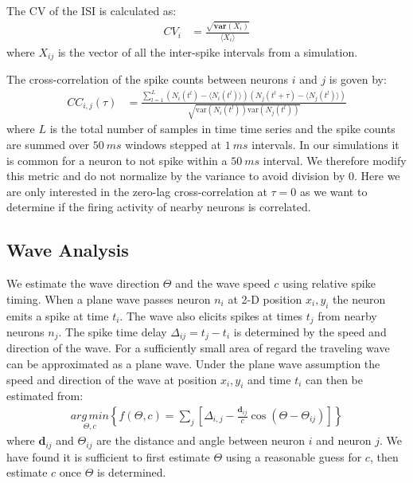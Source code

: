 \documentclass[12pt]{article}
\begin{document}
The CV of the ISI is calculated as:
\begin{align}\label{eq:cv}
 CV_{i} &= \frac{\sqrt{\textbf{var}(X_{i})}}{\langle X_{i} \rangle}
\end{align}
where $X_{ij}$ is the vector of all the inter-spike intervals from a simulation.

The cross-correlation of the spike counts between neurons $i$ and $j$ is goven by:
\begin{align}\label{eq:cross_correlation}
 CC_{i,j}(\tau) &= \frac{ \sum_{l=1}^L (N_i(t^l)-\langle N_i(t^l) \rangle) (N_j(t^l+\tau)-\langle N_j(t^l) \rangle) } { \sqrt{\text{var}(N_i(t^l))\text{var}(N_j(t^l))}  }
\end{align}
where $L$ is the total number of samples in time time series and the spike counts are summed over $50~ms$ windows stepped at $1~ms$ intervals.
In our simulations it is common for a neuron to not spike within a $50~ms$ interval.
We therefore modify this metric and do not normalize by the variance to avoid division by $0$.
Here we are only interested in the zero-lag cross-correlation at $\tau=0$ as we want to determine if the firing activity of nearby neurons is correlated.

\subsection{Wave Analysis}
We estimate the wave direction $\Theta$ and the wave speed $c$ using relative spike timing.
When a plane wave passes neuron $n_i$ at 2-D position $x_i,y_i$ the neuron emits a spike at time $t_i$.
The wave also elicits spikes at times $t_j$ from nearby neurons $n_j$.
The spike time delay $\Delta_{ij}=t_j-t_i$ is determined by the speed and direction of the wave.
For a sufficiently small area of regard the traveling wave can be approximated as a plane wave.
Under the plane wave assumption the speed and direction of the wave at position $x_i,y_i$ and time $t_i$ can then be estimated from:
\begin{align}\label{eq:wave_estimate}
\underset{\Theta,c}{arg\,min}\left\{f(\Theta,c) = \sum_j \left[ \Delta_{i,j}-\frac{\mathbf{d}_{ij}}{c}\cos(\Theta-\Theta_{ij}) \right]  \right\}
\end{align}
where $\mathbf{d}_{ij}$ and $\Theta_{ij}$ are the distance and angle between neuron $i$ and neuron $j$.
We have found it is sufficient to first estimate $\Theta$ using a reasonable guess for $c$, then estimate $c$ once $\Theta$ is determined.
\end{document}
